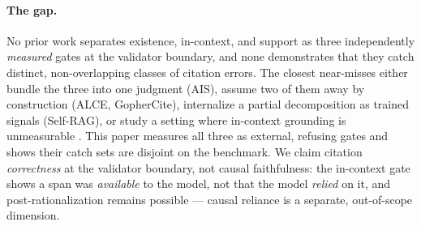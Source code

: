 \paragraph{The gap.}
No prior work separates existence, in-context, and support as three
independently \emph{measured} gates at the validator boundary, and
none demonstrates that they catch distinct, non-overlapping classes of
citation errors. The closest near-misses either bundle the three into
one judgment (AIS), assume two of them away by construction (ALCE,
GopherCite), internalize a partial decomposition as trained signals
(Self-RAG), or study a setting where in-context grounding is
unmeasurable \citep{liu2023verifiability}. This paper measures all
three as external, refusing gates and shows their catch sets are
disjoint on the benchmark. We claim citation \emph{correctness} at the
validator boundary, not causal faithfulness: the in-context gate shows
a span was \emph{available} to the model, not that the model
\emph{relied} on it, and post-rationalization remains possible
\citep[cf.][]{wallat2024correctness} --- causal reliance is a
separate, out-of-scope dimension.

